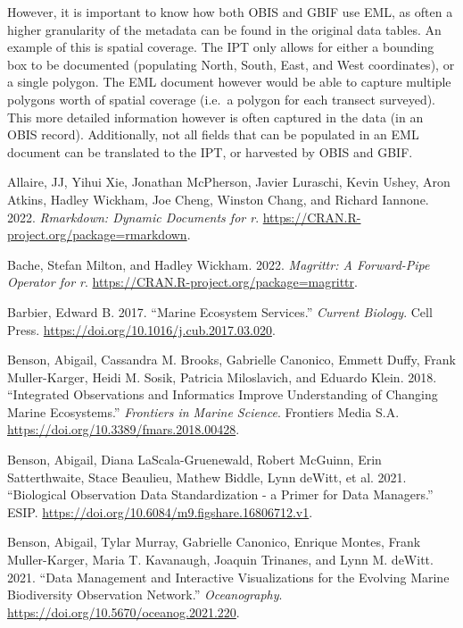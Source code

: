\documentclass[
]{book}
\newlength{\cslhangindent}
\newlength{\cslentryspacingunit} %
\newenvironment{CSLReferences}[2] %
 {%
  \setlength{\parindent}{0pt}
  \ifodd #1
  \let\oldpar\par
  \def\par{\hangindent=\cslhangindent\oldpar}
  \fi
  \setlength{\parskip}{#2\cslentryspacingunit}
 }%
 {}
\begin{document}
However, it is important to know how both OBIS and GBIF use EML, as often a higher granularity of the metadata can be found in the original data tables. An example of this is spatial coverage. The IPT only allows for either a bounding box to be documented (populating North, South, East, and West coordinates), or a single polygon. The EML document however would be able to capture multiple polygons worth of spatial coverage (i.e.~a polygon for each transect surveyed). This more detailed information however is often captured in the data (in an OBIS record). Additionally, not all fields that can be populated in an EML document can be translated to the IPT, or harvested by OBIS and GBIF.

\hypertarget{refs}{}
\begin{CSLReferences}{1}{0}
\leavevmode{}%
Allaire, JJ, Yihui Xie, Jonathan McPherson, Javier Luraschi, Kevin Ushey, Aron Atkins, Hadley Wickham, Joe Cheng, Winston Chang, and Richard Iannone. 2022. \emph{Rmarkdown: Dynamic Documents for r}. \url{https://CRAN.R-project.org/package=rmarkdown}.

\leavevmode{}%
Bache, Stefan Milton, and Hadley Wickham. 2022. \emph{Magrittr: A Forward-Pipe Operator for r}. \url{https://CRAN.R-project.org/package=magrittr}.

\leavevmode{}%
Barbier, Edward B. 2017. {``Marine Ecosystem Services.''} \emph{Current Biology}. Cell Press. \url{https://doi.org/10.1016/j.cub.2017.03.020}.

\leavevmode{}%
Benson, Abigail, Cassandra M. Brooks, Gabrielle Canonico, Emmett Duffy, Frank Muller-Karger, Heidi M. Sosik, Patricia Miloslavich, and Eduardo Klein. 2018. {``Integrated Observations and Informatics Improve Understanding of Changing Marine Ecosystems.''} \emph{Frontiers in Marine Science}. Frontiers Media S.A. \url{https://doi.org/10.3389/fmars.2018.00428}.

\leavevmode{}%
Benson, Abigail, Diana LaScala-Gruenewald, Robert McGuinn, Erin Satterthwaite, Stace Beaulieu, Mathew Biddle, Lynn deWitt, et al. 2021. {``Biological Observation Data Standardization - a Primer for Data Managers.''} ESIP. \url{https://doi.org/10.6084/m9.figshare.16806712.v1}.

\leavevmode{}%
Benson, Abigail, Tylar Murray, Gabrielle Canonico, Enrique Montes, Frank Muller-Karger, Maria T. Kavanaugh, Joaquin Trinanes, and Lynn M. deWitt. 2021. {``Data Management and Interactive Visualizations for the Evolving Marine Biodiversity Observation Network.''} \emph{Oceanography}. \url{https://doi.org/10.5670/oceanog.2021.220}.


\end{CSLReferences}
\end{document}
